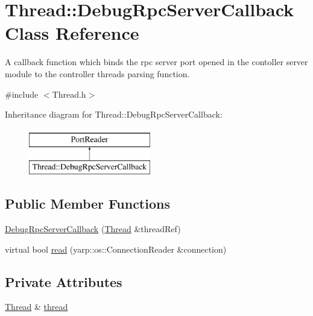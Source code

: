 \hypertarget{classThread_1_1DebugRpcServerCallback}{}\section{Thread\+:\+:Debug\+Rpc\+Server\+Callback Class Reference}
\label{classThread_1_1DebugRpcServerCallback}


A callback function which binds the rpc server port opened in the contoller server module to the controller thread\textquotesingle{}s parsing function.  




{\ttfamily \#include $<$Thread.\+h$>$}

Inheritance diagram for Thread\+:\+:Debug\+Rpc\+Server\+Callback\+:\begin{figure}[H]
\begin{center}
\leavevmode
\includegraphics[height=2.000000cm]{classThread_1_1DebugRpcServerCallback}
\end{center}
\end{figure}
\subsection*{Public Member Functions}
\begin{DoxyCompactItemize}
\item 
\hyperlink{classThread_1_1DebugRpcServerCallback_a479142cdf2f840df23b4605a532aaddf}{Debug\+Rpc\+Server\+Callback} (\hyperlink{classThread}{Thread} \&thread\+Ref)
\item 
virtual bool \hyperlink{classThread_1_1DebugRpcServerCallback_a3b39ac9b379ce3212bb2b05a89fa6024}{read} (yarp\+::os\+::\+Connection\+Reader \&connection)
\end{DoxyCompactItemize}
\subsection*{Private Attributes}
\begin{DoxyCompactItemize}
\item 
\hyperlink{classThread}{Thread} \& \hyperlink{classThread_1_1DebugRpcServerCallback_ad75683fc200019e8f681ad441b6ce84b}{thread}
\end{DoxyCompactItemize}


